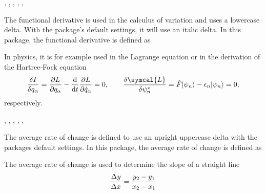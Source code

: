 	\begin{function}{\fdv}
		\begin{syntax}
			\sarg, , , \targ{/}, , 
		\end{syntax}
		The functional derivative is used in the calculus of variation and uses a lowercase delta. With the package's default settings, it will use an italic delta. In this package, the functional derivative is defined as
		
		\begin{definition}
			\DeclareDerivative{\fdv}{\delta}
		\end{definition}
		
		\noindent In physics, it is for example used in the Lagrange equation or in the derivation of the Hartree-Fock equation
		\begin{equation*}
			\fdv{I}{q_{\alpha}} = \pdv{L}{q_{\alpha}} - \odv*{ \pdv{L}{ \dot{q}_{\alpha} } } { t } = 0, \qquad \fdv{ \symcal{L} }{ \psi_{n}^* } = \hat{F} \ket{\psi_{n}} - \epsilon_{n} \ket{\psi_{n}} = 0
			,
		\end{equation*}
		respectively.
	\end{function}
	
	\begin{function}{\adv}
		\begin{syntax}
			\sarg, , , \targ{/}, , \earg{\_, point\tsb{1}, \^, point\tsb{2}}
		\end{syntax}
		The average rate of change is defined to use an upright uppercase delta with the packages default settings. In this package, the average rate of change is defined as
		
		\begin{definition}
			\DeclareDerivative{\adv}{\Delta}
		\end{definition}
		
		\noindent The average rate of change is used to determine the slope of a straight line
		\begin{equation*}
			\adv{ y }{ x } = \frac{y_2- y_1}{x_2 - x_1}
		\end{equation*}
	\end{function}
	
